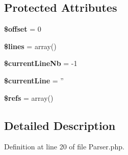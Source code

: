 \subsection*{Protected Attributes}
\begin{DoxyCompactItemize}
\item 
\hypertarget{class_symfony_1_1_components_1_1_yaml_1_1_parser_aec4de82415d7f05cb9748d12d3a95a87}{
{\bfseries \$offset} = 0}
\label{class_symfony_1_1_components_1_1_yaml_1_1_parser_aec4de82415d7f05cb9748d12d3a95a87}

\item 
\hypertarget{class_symfony_1_1_components_1_1_yaml_1_1_parser_a470f99c17f2e6f0a5a7b96f44cfc46a5}{
{\bfseries \$lines} = array()}
\label{class_symfony_1_1_components_1_1_yaml_1_1_parser_a470f99c17f2e6f0a5a7b96f44cfc46a5}

\item 
\hypertarget{class_symfony_1_1_components_1_1_yaml_1_1_parser_ac1ceccab6204b114cb80206c8bc45f61}{
{\bfseries \$currentLineNb} = -\/1}
\label{class_symfony_1_1_components_1_1_yaml_1_1_parser_ac1ceccab6204b114cb80206c8bc45f61}

\item 
\hypertarget{class_symfony_1_1_components_1_1_yaml_1_1_parser_ab86be58497f4553475dd9234304c7014}{
{\bfseries \$currentLine} = ''}
\label{class_symfony_1_1_components_1_1_yaml_1_1_parser_ab86be58497f4553475dd9234304c7014}

\item 
\hypertarget{class_symfony_1_1_components_1_1_yaml_1_1_parser_a8f8757e72f75875c4520aa66624dfae2}{
{\bfseries \$refs} = array()}
\label{class_symfony_1_1_components_1_1_yaml_1_1_parser_a8f8757e72f75875c4520aa66624dfae2}

\end{DoxyCompactItemize}


\subsection{Detailed Description}


Definition at line 20 of file Parser.php.



